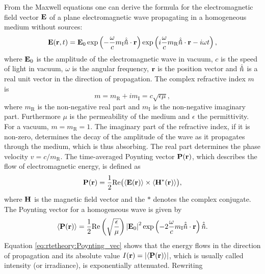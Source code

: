  From the Maxwell equations one can derive the formula for the
electromagnetic field vector $\mathbf{E}$ of a plane electromagnetic
wave propagating in a homogeneous medium without sources:
\begin{equation}
  \mathbf{E}(\mathbf{r}, t) =
  \mathbf{E}_0
  \exp\left(-\frac{\omega}{c} m_{\mathrm{I}} \hat{{\bf \hat{n}}} \cdot \mathbf{r}\right)
  \exp\left(i \frac{\omega}{c} m_{\mathrm{R}} \hat{{\bf \hat{n}}} \cdot \mathbf{r}  - i \omega t \right),
\end{equation}
where $\mathbf{E}_0$ is the amplitude of the electromagnetic wave in
vacuum, $c$ is the speed of light in vacuum, $\omega$ is the angular
frequency, $\mathbf{r}$ is the position vector and $\hat{{\bf \hat{n}}}$
is a real unit vector in the direction of propagation. The complex
refractive index $m$ is
\begin{equation}
  m = m_{\mathrm{R}}+ i m_{\mathrm{I}} = c \sqrt{\epsilon \mu},
\end{equation}
where $m_{\mathrm{R}}$ is the non-negative real part and $m_{\mathrm{I}}$ is the non-negative imaginary part. Furthermore $\mu$ is the
permeability of the medium and $\epsilon$ the permittivity.  For a
vacuum, $m = m_{\mathrm{R}} = 1$.  The imaginary part of the refractive
index, if it is non-zero, determines the decay of the amplitude of the
wave as it propagates through the medium, which is thus absorbing.
The real part determines the phase velocity $v = c/m_{\mathrm{R}}$.
The time-averaged Poynting vector $\mathbf{P}(\mathbf{r})$, which describes the
flow of electromagnetic energy, is defined as
\begin{equation}
   \mathbf{P}(\mathbf{r}) =
     \frac{1}{2} \mathrm{Re} \bigl(\left\langle \mathbf{E}(\mathbf{r}) \right\rangle \times
     \left\langle \mathbf{H}^*(\mathbf{r}) \right\rangle\bigr),
\end{equation}
where $\mathbf{H}$ is the magnetic field vector and the $*$ denotes the
complex conjugate. The Poynting vector for a homogeneous wave is given
by
\begin{equation}
\label{eq:rtetheory:Poynting_vec}
  \left\langle \mathbf{P}(\mathbf{r}) \right\rangle =
   \frac{1}{2}\mathrm{Re} \left( \sqrt{\frac{\epsilon}{\mu}} \right)
   \left| \mathbf{E}_0 \right| ^2
   \exp\left(-2\frac{\omega}{c} m_{\mathrm{I}} \hat{{\bf \hat{n}}} \cdot
     \mathbf{r}\right) \hat{{\bf \hat{n}}}.
\end{equation}
Equation \ref{eq:rtetheory:Poynting_vec} shows that the energy flows in the
direction of propagation and its absolute value $I(\mathbf{r}) =
\left| \left\langle \mathbf{P}(\mathbf{r}) \right\rangle \right| $, which is usually called
intensity (or irradiance), is exponentially attenuated. Rewriting
